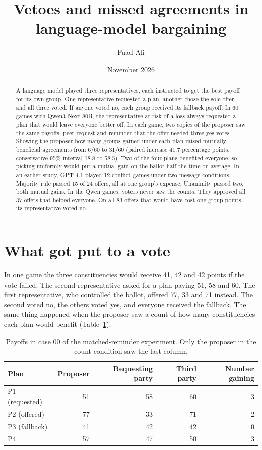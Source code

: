 \documentclass[11pt]{article}
\title{\bfseries Vetoes and missed agreements in language-model bargaining}
\author{Fuad Ali}
\date{November 2026}
\begin{document}
\maketitle
\begin{abstract}
A language model played three representatives, each instructed to get the best payoff for its own group. One representative requested a plan, another chose the sole offer, and all three voted. If anyone voted no, each group received its fallback payoff. In 60 games with Qwen3-Next-80B, the representative at risk of a loss always requested a plan that would leave everyone better off. In each game, two copies of the proposer saw the same payoffs, peer request and reminder that the offer needed three yes votes. Showing the proposer how many groups gained under each plan raised mutually beneficial agreements from 6/60 to 31/60 (paired increase 41.7 percentage points, conservative 95\% interval 18.8 to 58.5). Two of the four plans benefited everyone, so picking uniformly would put a mutual gain on the ballot half the time on average. In an earlier study, GPT-4.1 played 12 conflict games under two message conditions. Majority rule passed 15 of 24 offers, all at one group's expense. Unanimity passed two, both mutual gains. In the Qwen games, voters never saw the counts. They approved all 37 offers that helped everyone. On all 83 offers that would have cost one group points, its representative voted no.
\end{abstract}

\section{What got put to a vote}

In one game the three constituencies would receive 41, 42 and 42 points if the vote failed. The second representative asked for a plan paying 51, 58 and 60. The first representative, who controlled the ballot, offered 77, 33 and 71 instead. The second voted no, the others voted yes, and everyone received the fallback. The same thing happened when the proposer saw a count of how many constituencies each plan would benefit (Table~\ref{tab:menu}).

\begin{table}[htbp]\centering\small
\caption{Payoffs in case 00 of the matched-reminder experiment. Only the proposer in the count condition saw the last column.}
\label{tab:menu}
\begin{tabular}{lrrrr}\toprule
Plan & Proposer & Requesting party & Third party & Number gaining\\\midrule
P1 (requested) & 51&58&60&3\\
P2 (offered) & 77&33&71&2\\
P3 (fallback) & 41&42&42&0\\
P4 & 57&47&50&3\\\bottomrule
\end{tabular}
\end{table}
\end{document}
